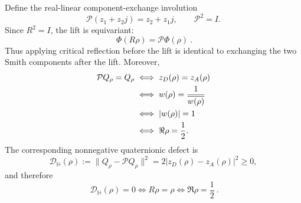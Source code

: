 \documentclass[11pt]{amsart}
\theoremstyle{definition}
\theoremstyle{remark}
\begin{document}
Define the real-linear component-exchange involution
\begin{equation}\label{eq:quaternion-exchange}
 \mathcal P(z_1+z_2j)=z_2+z_1j,
 \qquad \mathcal P^2=I.
\end{equation}
Since $R^2=I$, the lift is equivariant:
\begin{equation}\label{eq:quaternion-equivariance}
 \boxed{\ \Phi(R\rho)=\mathcal P\Phi(\rho)\ }.
\end{equation}
Thus applying critical reflection before the lift is identical to exchanging the two Smith
components after the lift.  Moreover,
\begin{align}
 \mathcal P Q_\rho=Q_\rho
 &\iff z_D(\rho)=z_A(\rho)\notag\\
 &\iff w(\rho)=\frac1{\overline{w(\rho)}}\notag\\
 &\iff |w(\rho)|=1\notag\\
 &\iff \Re\rho=\frac12.\label{eq:quaternion-fixed-chain}
\end{align}
The corresponding nonnegative quaternionic defect is
\begin{equation}\label{eq:quaternion-defect}
 \mathcal D_{\mathbb H}(\rho)
 :=\|Q_\rho-\mathcal P Q_\rho\|^2
 =2|z_D(\rho)-z_A(\rho)|^2\ge0,
\end{equation}
and therefore
\begin{equation}\label{eq:quaternion-defect-zero}
 \boxed{\ \mathcal D_{\mathbb H}(\rho)=0
 \iff R\rho=\rho
 \iff \Re\rho=\frac12\ }.
\end{equation}
\end{document}
